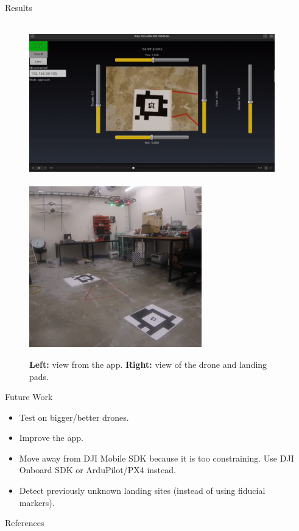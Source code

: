 \documentclass[final, 20pt]{beamer}
\newlength{\sepwidth}
\newlength{\colwidth}
\newcommand{\separatorcolumn}{\begin{column}{\sepwidth}\end{column}}
\begin{document}
\begin{frame}[t]
\begin{columns}[t]
\begin{column}{\colwidth}
\begin{block}{Results}
    \begin{figure}
      \centering
      \includegraphics[height=7cm]{images/tablet_screenshot}
      \hspace{1cm}
      \includegraphics[height=7cm]{images/drone_screenshot}
      \caption{\textbf{Left:} view from the app. \textbf{Right:} view of the drone and landing pads.}
    \end{figure}

  \end{block}

  \begin{block}{Future Work}
    \begin{itemize}
      \item Test on bigger/better drones.
      \item Improve the app.
      \item Move away from DJI Mobile SDK because it is too constraining.
            Use DJI Onboard SDK or ArduPilot/PX4 instead.
      \item Detect previously unknown landing sites (instead of using fiducial markers).
    \end{itemize}
  \end{block}

  \vspace{5cm}
  \begin{block}{References}

    \nocite{*}
    \footnotesize{}

  \end{block}

\end{column}

\separatorcolumn
\end{columns}
\end{frame}
\end{document}
